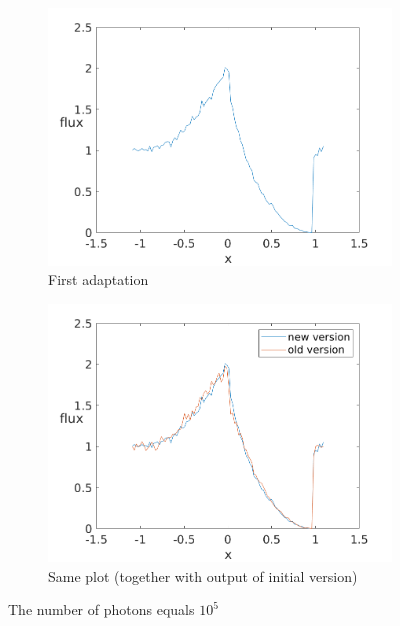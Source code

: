 \documentclass[../main/main.tex]{subfiles}
\begin{document}
\begin{figure}[!htbp]
\centering
\begin{subfigure}{.5\textwidth}
\includegraphics[width=1\textwidth]{../../introductory_exercises/P_Cygni_profile_UV_resonance/npot5xk0100alpha0beta1test1.png}
\caption{First adaptation}
\end{subfigure}%
\begin{subfigure}{.5\textwidth}
\includegraphics[width=1\textwidth]{../../introductory_exercises/P_Cygni_profile_UV_resonance/npot5xk0100alpha0beta1test10.png}
\caption{Same plot (together with output of initial version)}
\end{subfigure}
\caption{The number of photons equals $10^{5}$}
\label{PCyg_mu_eq_1}
\end{figure}
\end{document}
